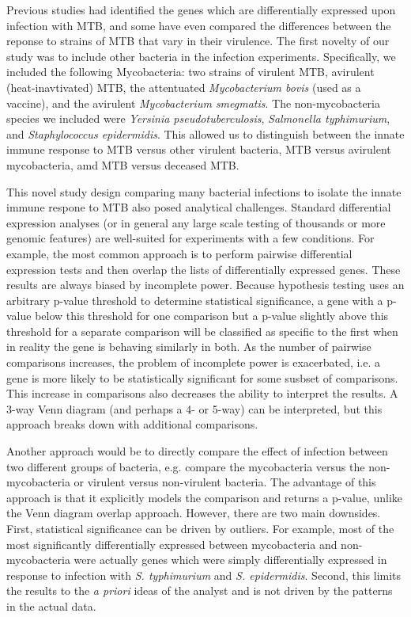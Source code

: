 Previous studies had identified the genes which
are differentially expressed upon infection with MTB, and some have
even compared the differences between the reponse to strains of MTB
that vary in their virulence. The first novelty of our study was to
include other bacteria in the infection experiments. Specifically, we
included the following Mycobacteria: two strains of virulent MTB,
avirulent (heat-inavtivated) MTB, the attentuated \emph{Mycobacterium
  bovis} (used as a vaccine), and the avirulent \emph{Mycobacterium
  smegmatis}. The non-mycobacteria species we included were
\emph{Yersinia pseudotuberculosis}, \emph{Salmonella typhimurium}, and
\emph{Staphylococcus epidermidis}. This allowed us to distinguish
between the innate immune response to MTB versus other virulent
bacteria, MTB versus avirulent mycobacteria, amd MTB versus deceased
MTB.

This novel study design comparing many bacterial infections to isolate
the innate immune respone to MTB also posed analytical
challenges. Standard differential expression analyses (or in general
any large scale testing of thousands or more genomic features) are
well-suited for experiments with a few conditions. For example, the
most common approach is to perform pairwise differential expression
tests and then overlap the lists of differentially expressed
genes. These results are always biased by incomplete power. Because
hypothesis testing uses an arbitrary p-value threshold to determine
statistical significance, a gene with a p-value below this threshold
for one comparison but a p-value slightly above this threshold for a
separate comparison will be classified as specific to the first when
in reality the gene is behaving similarly in both. As the number of
pairwise comparisons increases, the problem of incomplete power is
exacerbated, i.e. a gene is more likely to be statistically
significant for some susbset of comparisons. This increase in
comparisons also decreases the ability to interpret the results. A
3-way Venn diagram (and perhaps a 4- or 5-way) can be interpreted, but
this approach breaks down with additional comparisons.

Another approach would be to directly compare the effect of infection between
two different groups of bacteria, e.g. compare the mycobacteria versus the
non-mycobacteria or virulent versus non-virulent bacteria. The advantage of this
approach is that it explicitly models the comparison and returns a p-value,
unlike the Venn diagram overlap approach. However, there are two main
downsides. First, statistical significance can be driven by outliers. For
example, most of the most significantly differentially expressed between
mycobacteria and non-mycobacteria were actually genes which were simply
differentially expressed in response to infection with \emph{S. typhimurium} and
\emph{S. epidermidis}. Second, this limits the results to the \emph{a priori}
ideas of the analyst and is not driven by the patterns in the actual data.

